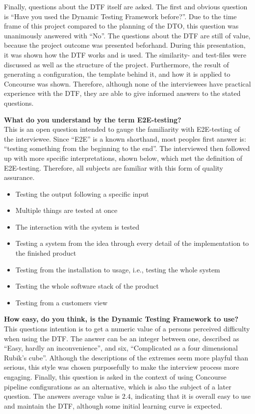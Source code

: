 Finally, questions about the DTF itself are asked.
The first and obvious question is ``Have you used the Dynamic Testing Framework before?''.
Due to the time frame of this project compared to the planning of the DTO, this question was unanimously answered with ``No''.
The questions about the DTF are still of value, because the project outcome was presented beforhand.
During this presentation, it was shown how the DTF works and is used.
The similarity- and test-files were discussed as well as the structure of the project.
Furthermore, the result of generating a configuration, the template behind it, and how it is applied to Concourse was shown.
Therefore, although none of the interviewees have practical experience with the DTF, they are able to give informed answers to the stated questions.

\textbf{What do you understand by the term E2E-testing?}\\
This is an open question intended to gauge the familiarity with E2E-testing of the interviewee.
Since ``E2E'' is a known shorthand, most peoples first answer is: ``testing something from the beginning to the end''.
The interviewed then followed up with more specific interpretations, shown below, which met the definition of E2E-testing.
Therefore, all subjects are familiar with this form of quality assurance.

\pagebreak

\begin{itemize}
    \item Testing the output following a specific input
    \item Multiple things are tested at once
    \item The interaction with the system is tested
    \item Testing a system from the idea through every detail of the implementation to the finished product
    \item Testing from the installation to usage, i.e., testing the whole system
    \item Testing the whole software stack of the product
    \item Testing from a customers view
\end{itemize}

\textbf{How easy, do you think, is the Dynamic Testing Framework to use?}\\
This questions intention is to get a numeric value of a persons perceived difficulty when using the DTF.
The answer can be an integer between one, described as ``Easy, hardly an inconvenience'', and six, ``Complicated as a four dimensional Rubik's cube''.
Although the descriptions of the extremes seem more playful than serious, this style was chosen purposefully to make the interview process more engaging.
Finally, this question is asked in the context of using Concourse pipeline configurations as an alternative, which is also the subject of a later question.
The answers average value is $2.4$, indicating that it is overall easy to use and maintain the DTF, although some initial learning curve is expected.

